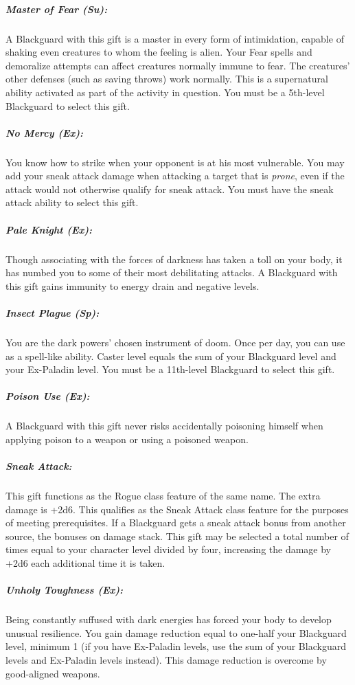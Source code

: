 \subparagraph{Master of Fear (Su):}
A Blackguard with this gift is a master in every form of intimidation, capable of shaking even creatures to whom the feeling is alien. Your Fear spells and demoralize attempts can affect creatures normally immune to fear. The creatures' other defenses (such as saving throws) work normally. This is a supernatural ability activated as part of the activity in question.
You must be a 5th-level Blackguard to select this gift.

\subparagraph{No Mercy (Ex):}
You know how to strike when your opponent is at his most vulnerable. You may add your sneak attack damage when attacking a target that is \emph{prone}, even if the attack would not otherwise qualify for sneak attack. You must have the sneak attack ability to select this gift.

\subparagraph{Pale Knight (Ex):}
Though associating with the forces of darkness has taken a toll on your body, it has numbed you to some of their most debilitating attacks. A Blackguard with this gift gains immunity to energy drain and negative levels. 

\subparagraph{Insect Plague (Sp):}
You are the dark powers' chosen instrument of doom. Once per day, you can use  as a spell-like ability. Caster level equals the sum of your Blackguard level and your Ex-Paladin level.
You must be a 11th-level Blackguard to select this gift.

\subparagraph{Poison Use (Ex):}
A Blackguard with this gift never risks accidentally poisoning himself when applying poison to a weapon or using a poisoned weapon.

\subparagraph{Sneak Attack:}
This gift functions as the Rogue class feature of the same name. 
The extra damage is +2d6. 
This qualifies as the Sneak Attack class feature for the purposes of meeting prerequisites.
If a Blackguard gets a sneak attack bonus from another source, the bonuses on damage stack.
This gift may be selected a total number of times equal to your character level divided by four, increasing the damage by +2d6 each additional time it is taken.

\subparagraph{Unholy Toughness (Ex):}
Being constantly suffused with dark energies has forced your body to develop unusual resilience. You gain damage reduction equal to one-half your Blackguard level, minimum 1 (if you have Ex-Paladin levels, use the sum of your Blackguard levels and Ex-Paladin levels instead). This damage reduction is overcome by good-aligned weapons.

